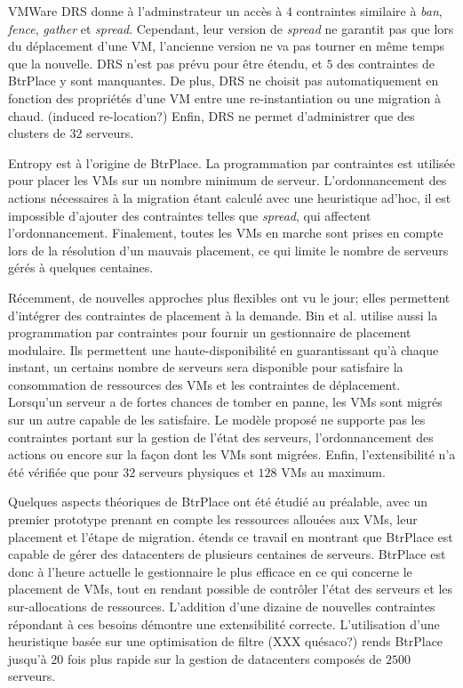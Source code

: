 \documentclass[a4paper]{article}
\begin{document}
VMWare DRS donne à l'adminstrateur un accès à $4$ contraintes
similaire à \textit{ban}, \textit{fence}, \textit{gather} et
\textit{spread}. Cependant, leur version de \textit{spread}
ne garantit pas que lors du déplacement d'une VM, l'ancienne
version ne va pas tourner en même temps que la nouvelle.
DRS n'est pas prévu pour être étendu, et $5$ des contraintes
de BtrPlace y sont manquantes. De plus, DRS ne choisit pas
automatiquement en fonction des propriétés d'une VM entre
une re-instantiation ou une migration à chaud. (induced re-location?)
Enfin, DRS ne permet d'administrer que des clusters de $32$
serveurs.

Entropy est à l'origine de BtrPlace. La programmation par contraintes
est utilisée pour placer les VMs sur un nombre minimum de serveur.
L'ordonnancement des actions nécessaires à la migration étant calculé
avec une heuristique ad'hoc, il est impossible d'ajouter des
contraintes telles que \textit{spread}, qui affectent l'ordonnancement.
Finalement, toutes les VMs en marche sont prises en compte lors
de la résolution d'un mauvais placement, ce qui limite le nombre
de serveurs gérés à quelques centaines.

Récemment, de nouvelles approches plus flexibles ont vu le jour;
elles permettent d'intégrer des contraintes de placement à la
demande. Bin et al. utilise aussi la programmation par contraintes
pour fournir un gestionnaire de placement modulaire. Ils
permettent une haute-disponibilité en guarantissant qu'à chaque instant,
un certains nombre de serveurs sera disponible pour satisfaire
la consommation de ressources des VMs et les contraintes de
déplacement. Lorsqu'un serveur a de fortes chances de tomber en panne,
les VMs sont migrés sur un autre capable de les satisfaire. Le modèle
proposé ne supporte pas les contraintes portant sur la gestion de
l'état des serveurs, l'ordonnancement des actions ou encore sur la
façon dont les VMs sont migrées. Enfin, l'extensibilité n'a été
vérifiée que pour $32$ serveurs physiques et $128$ VMs au maximum.

Quelques aspects théoriques de BtrPlace ont été étudié au préalable,
avec un premier prototype prenant en compte les ressources allouées
aux VMs, leur placement et l'étape de migration. \cite{herm2012}
étends ce travail en montrant que BtrPlace est capable de gérer
des datacenters de plusieurs centaines de serveurs. BtrPlace
est donc à l'heure actuelle le gestionnaire le plus efficace en
ce qui concerne le placement de VMs, tout en rendant possible
de contrôler l'état des serveurs et les sur-allocations de ressources.
L'addition d'une dizaine de nouvelles contraintes répondant à
ces besoins démontre une extensibilité correcte. L'utilisation
d'une heuristique basée sur une optimisation de filtre (XXX quésaco?)
rends BtrPlace jusqu'à $20$ fois plus rapide sur la gestion de
datacenters composés de $2500$ serveurs.
\end{document}
